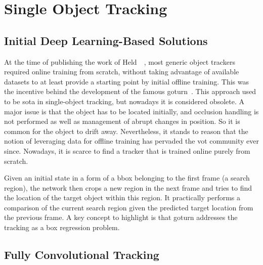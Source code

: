 \section{Single Object Tracking}
\label{sec:SingleObjectTracking}

\subsection{Initial Deep Learning-Based Solutions}
\label{ssec:InitialDeepLearningBasedSolutions}

At the time of publishing the work of Held~\etal{}~\cite{held2016goturn}, most generic object trackers required online training from scratch, without taking advantage of available datasets to at least provide a starting point by initial offline training. This was the incentive behind the development of the famous \gls{goturn}~\cite{held2016goturn}. This approach used to be \gls{sota} in single-object tracking, but nowadays it is considered obsolete. A major issue is that the object has to be located initially, and occlusion handling is not performed as well as management of abrupt changes in position. So it is common for the object to drift away. Nevertheless, it stands to reason that the notion of leveraging data for offline training has pervaded the \gls{vot} community ever since. Nowadays, it is scarce to find a tracker that is trained online purely from scratch.

Given an initial state in a form of a \gls{bbox} belonging to the first frame (a search region), the network then crops a new region in the next frame and tries to find the location of the target object within this region. It practically performs a comparison of the current search region given the predicted target location from the previous frame. A key concept to highlight is that \gls{goturn} addresses the tracking as a box regression problem.

\subsection{Fully Convolutional Tracking}
\label{ssec:FullyConvolutionalTracking}

